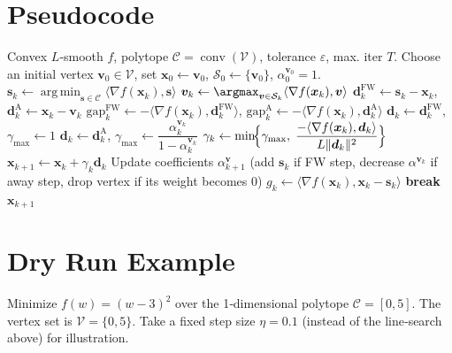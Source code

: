 \documentclass{article}
\newcommand{\argmin}{\operatorname*{arg\,min}}
\newcommand{\conv}{\operatorname*{conv}}
\begin{document}
\section*{Pseudocode}
\begin{algorithm}[H]
\caption{Away–Step Frank–Wolfe (AFW)}\label{alg:afw}
\begin{algorithmic}[1]
\Require Convex $L$‑smooth $f$, polytope $\mathcal{C}=\conv(\mathcal{V})$, tolerance $\varepsilon$, max. iter $T$.
\State Choose an initial vertex $\bm{v}_{0}\in\mathcal{V}$, set $\bm{x}_{0}\gets\bm{v}_{0}$, $\mathcal{S}_{0}\gets\{\bm{v}_{0}\}$, $\alpha^{\bm{v}_{0}}_{0}=1$.
    \State $\bm{s}_{k}\gets \argmin_{\bm{s}\in\mathcal{C}}\langle\nabla f(\bm{x}_{k}),\bm{s}\rangle$ 
    \State $\bm{v}_{k}\gets \argmax_{\bm{v}\in\mathcal{S}_{k}}\langle\nabla f(\bm{x}_{k}),\bm{v}\rangle$
    \State $\bm{d}^{\text{FW}}_{k}\gets \bm{s}_{k}-\bm{x}_{k}$,\;
          $\bm{d}^{\text{A}}_{k}\gets \bm{x}_{k}-\bm{v}_{k}$
    \State $\text{gap}^{\text{FW}}_{k}\gets -\langle\nabla f(\bm{x}_{k}),\bm{d}^{\text{FW}}_{k}\rangle$,
          $\text{gap}^{\text{A}}_{k}\gets -\langle\nabla f(\bm{x}_{k}),\bm{d}^{\text{A}}_{k}\rangle$
        \State $\bm{d}_{k}\gets \bm{d}^{\text{FW}}_{k}$,\;
              $\gamma_{\max}\gets 1$
    \Else
        \State $\bm{d}_{k}\gets \bm{d}^{\text{A}}_{k}$,\;
              $\gamma_{\max}\gets \dfrac{\alpha^{\bm{v}_{k}}_{k}}{1-\alpha^{\bm{v}_{k}}_{k}}$
    \EndIf
    \State $\gamma_{k}\gets \min\!\Bigl\{\gamma_{\max},\;
          \dfrac{-\langle\nabla f(\bm{x}_{k}),\bm{d}_{k}\rangle}{L\|\bm{d}_{k}\|^{2}}\Bigr\}$ 
    \State $\bm{x}_{k+1}\gets \bm{x}_{k}+ \gamma_{k}\bm{d}_{k}$
    \State Update coefficients $\alpha^{\bm{v}}_{k+1}$ (add $\bm{s}_{k}$ if FW step, decrease $\alpha^{\bm{v}_{k}}$ if away step, drop vertex if its weight becomes $0$)
    \State $g_{k}\gets \langle\nabla f(\bm{x}_{k}),\bm{x}_{k}-\bm{s}_{k}\rangle$
        \State \textbf{break}
    \EndIf
\EndFor
\State \Return $\bm{x}_{k+1}$
\end{algorithmic}
\end{algorithm}

\section*{Dry Run Example}
Minimize $f(w)=(w-3)^{2}$ over the 1‑dimensional polytope $\mathcal{C}= [0,5]$.
The vertex set is $\mathcal{V}=\{0,5\}$.  
Take a fixed step size $\eta=0.1$ (instead of the line‑search above) for illustration.
\end{document}
